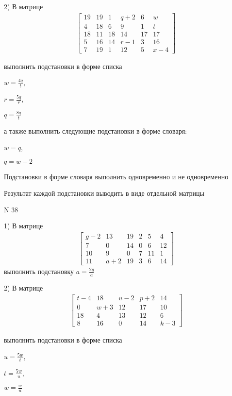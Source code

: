 \documentclass[11pt]{report}
\begin{document}
    2) В матрице
\begin{align*}
\left[\begin{matrix}19 & 19 & 1 & q + 2 & 6 & w\\4 & 18 & 6 & 9 & 1 & t\\18 & 11 & 18 & 14 & 17 & 17\\5 & 16 & 14 & r - 1 & 3 & 16\\7 & 19 & 1 & 12 & 5 & x - 4\end{matrix}\right]
\end{align*}

выполнить подстановки в форме списка

$w=\frac{4 q}{t}$,

$r=\frac{5 q}{r}$,

$q=\frac{8 q}{t}$

а также выполнить следующие подстановки в форме словаря:

$w=q$,

$q=w + 2$


    Подстановки в форме словаря выполнить одновременно и не одновременно


    Результат каждой подстановки выводить в виде отдельной матрицы

\newpage
N 38


    1) В матрице
\begin{align*}
\left[\begin{matrix}g - 2 & 13 & 19 & 2 & 5 & 4\\7 & 0 & 14 & 0 & 6 & 12\\10 & 9 & 0 & 7 & 11 & 1\\11 & a + 2 & 19 & 3 & 6 & 14\end{matrix}\right]
\end{align*}
выполнить подстановку $a=\frac{2 g}{a}$


    2) В матрице
\begin{align*}
\left[\begin{matrix}t - 4 & 18 & u - 2 & p + 2 & 14\\0 & w + 3 & 12 & 17 & 10\\18 & 4 & 13 & 12 & 6\\8 & 16 & 0 & 14 & k - 3\end{matrix}\right]
\end{align*}

выполнить подстановки в форме списка

$u=\frac{5 w}{t}$,

$t=\frac{5 w}{u}$,

$w=\frac{w}{u}$
\end{document}
